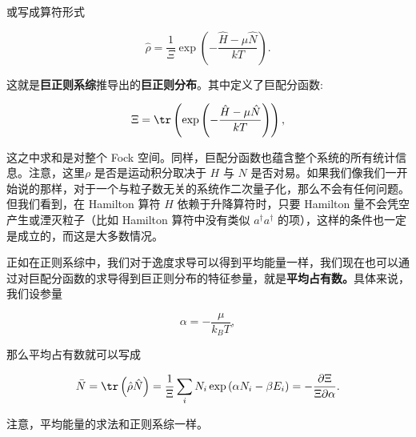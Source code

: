 或写成算符形式
\begin{linenomath}\begin{equation}
  \hat\rho = \frac{1}{\Xi} \exp\left( -\frac{\hat H-\mu{\hat{N}}}{kT} \right).
\end{equation}\end{linenomath}
这就是\textbf{巨正则系综}推导出的\textbf{巨正则分布}。其中定义了巨配分函数:
\begin{linenomath}\begin{equation}
\Xi = \tr\left( \exp\left( -\frac{\hat H-\mu{\hat{N}}}{kT} \right) \right),
\end{equation}\end{linenomath}
这之中求和是对整个 Fock 空间。同样，巨配分函数也蕴含整个系统的所有统计信息。注意，这里$\rho$ 是否是运动积分取决于 $H$ 与 $N$ 是否对易。如果我们像我们一开始说的那样，对于一个与粒子数无关的系统作二次量子化，那么不会有任何问题。但我们看到，在 Hamilton 算符 $H$ 依赖于升降算符时，只要 Hamilton 量不会凭空产生或湮灭粒子（比如 Hamilton 算符中没有类似 $a^\dagger a^\dagger$ 的项），这样的条件也一定是成立的，而这是大多数情况。

正如在正则系综中，我们对于逸度求导可以得到平均能量一样，我们现在也可以通过对巨配分函数的求导得到巨正则分布的特征参量，就是\textbf{平均占有数。}具体来说，我们设参量 \begin{linenomath}\begin{equation}\alpha = -\frac\mu {k_BT},\end{equation}\end{linenomath} 那么平均占有数就可以写成 \begin{linenomath}\begin{equation} \bar N = \tr\left( \hat\rho \hat N \right) = \frac1\Xi \sum_iN_i \exp\left( \alpha N_i-\beta E_i \right) = -\frac{\partial \Xi}{\Xi\partial \alpha}.\end{equation}\end{linenomath} 注意，平均能量的求法和正则系综一样。
